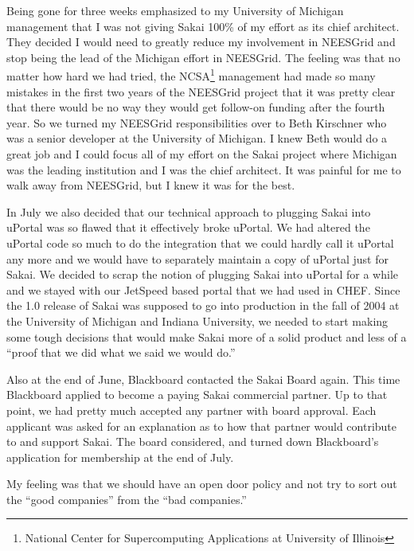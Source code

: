 \documentclass[12pt]{book}
\begin{document}
Being gone for three weeks emphasized to my University
of Michigan management that I was not giving Sakai
100\% of my effort as its chief architect.  They
decided I would need to greatly reduce my involvement
in NEESGrid and stop being the lead of the Michigan
effort in NEESGrid.  The feeling was that no matter
how hard we had tried, the
NCSA\footnote{National Center for Supercomputing Applications at University of Illinois}
management had made so many mistakes
in the first two years of the NEESGrid project
that it was pretty clear that
there would be no way they would get
follow-on funding after the
fourth year.
So we turned my NEESGrid responsibilities
over to Beth Kirschner who was a senior developer
at the University of Michigan.  I knew Beth would do a great
job and I could focus all of my effort on the Sakai
project where Michigan was the leading institution
and I was the chief architect.  It was painful for
me to walk away from NEESGrid, but I knew it was for
the best.

In July we also decided that our technical approach
to plugging Sakai into uPortal was so flawed that
it effectively broke uPortal.  We had altered the
uPortal code so much to do the integration that
we could hardly call it uPortal any more and we would
have to separately maintain a copy of
uPortal just for Sakai.
We decided to scrap the notion of plugging Sakai
into uPortal for a while and we stayed with
our JetSpeed based portal that we had used
in CHEF.  Since the 1.0
release of Sakai was supposed to go into production in
the fall of 2004 at the University of Michigan
and Indiana University, we needed to start making
some tough decisions that would make Sakai more of
a solid product and less of a ``proof that we did
what we said we would do.''



Also at the end of June, Blackboard contacted the
Sakai Board again.   This time Blackboard applied to become
a paying Sakai commercial partner.  Up to that
point, we had pretty much accepted any partner with board approval.
Each applicant was
asked for an explanation as to how
that partner would contribute to and support Sakai.  The
board considered, and
turned down Blackboard's application for membership
at the end of July.

My feeling was that we should have an open door
policy and not try to sort out the ``good companies'' from
the ``bad companies.''
\end{document}
